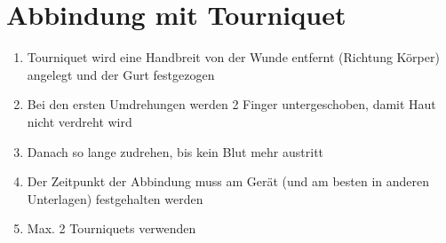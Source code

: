 \chapter{Abbindung mit Tourniquet}
\begin{enumerate}
    \item Tourniquet wird eine Handbreit von der Wunde entfernt (Richtung Körper) angelegt und der Gurt festgezogen
    \item Bei den ersten Umdrehungen werden 2 Finger untergeschoben, damit Haut nicht verdreht wird
    \item Danach so lange zudrehen, bis kein Blut mehr austritt
    \item Der Zeitpunkt der Abbindung muss am Gerät (und am besten in anderen Unterlagen) festgehalten werden
    \item Max. 2 Tourniquets verwenden
\end{enumerate}